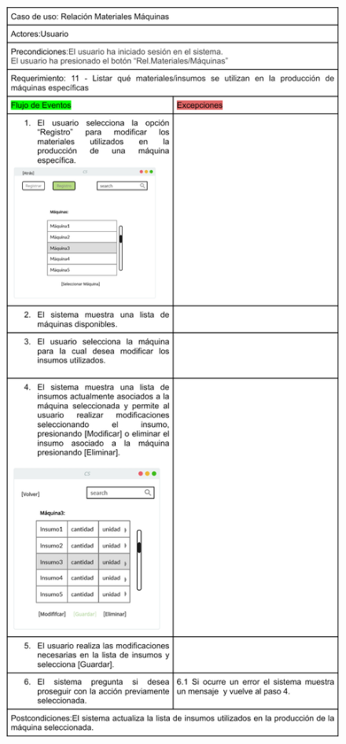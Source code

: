\documentclass{article}
\begin{document}
    
    \begin{figure}
        \begin{center}
            \includegraphics[width=0.88\linewidth]{imagenes/consulta_mod_eli.png}  
        \end{center}
    \end{figure}
    
\end{document}
